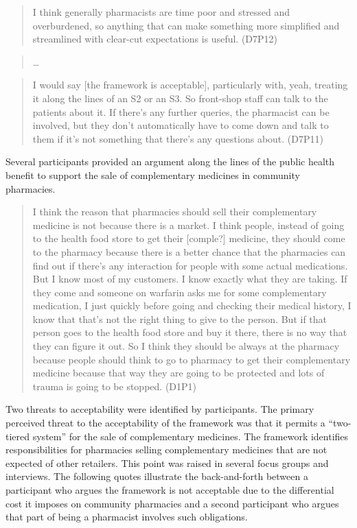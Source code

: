 \documentclass[12pt,]{article}
\begin{document}
\begin{quote}
I think generally pharmacists are time poor and stressed and
overburdened, so anything that can make something more simplified and
streamlined with clear-cut expectations is useful. (D7P12)
\end{quote}

\begin{quote}
\ldots{}
\end{quote}

\begin{quote}
I would say {[}the framework is acceptable{]}, particularly with, yeah,
treating it along the lines of an S2 or an S3. So front-shop staff can
talk to the patients about it. If there's any further queries, the
pharmacist can be involved, but they don't automatically have to come
down and talk to them if it's not something that there's any questions
about. (D7P11)
\end{quote}

Several participants provided an argument along the lines of the public
health benefit to support the sale of complementary medicines in
community pharmacies.

\begin{quote}
I think the reason that pharmacies should sell their complementary
medicine is not because there is a market. I think people, instead of
going to the health food store to get their {[}comple?{]} medicine, they
should come to the pharmacy because there is a better chance that the
pharmacies can find out if there's any interaction for people with some
actual medications. But I know most of my customers. I know exactly what
they are taking. If they come and someone on warfarin asks me for some
complementary medication, I just quickly before going and checking their
medical history, I know that that's not the right thing to give to the
person. But if that person goes to the health food store and buy it
there, there is no way that they can figure it out. So I think they
should be always at the pharmacy because people should think to go to
pharmacy to get their complementary medicine because that way they are
going to be protected and lots of trauma is going to be stopped. (D1P1)
\end{quote}

Two threats to acceptability were identified by participants. The
primary perceived threat to the acceptability of the framework was that
it permits a ``two-tiered system'' for the sale of complementary
medicines. The framework identifies responsibilities for pharmacies
selling complementary medicines that are not expected of other
retailers. This point was raised in several focus groups and interviews.
The following quotes illustrate the back-and-forth between a participant
who argues the framework is not acceptable due to the differential cost
it imposes on community pharmacies and a second participant who argues
that part of being a pharmacist involves such obligations.
\end{document}

